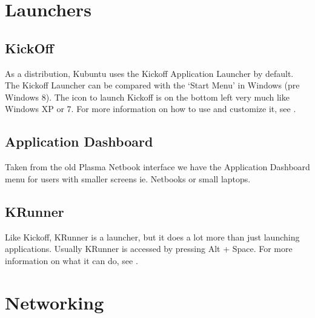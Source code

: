 \documentclass[letterpaper,10pt,english]{sphinxmanual}
\begin{document}
\section{Launchers}
\label{\detokenize{docs/basic:launchers}}

\subsection{KickOff}
\label{\detokenize{docs/basic:kickoff}}
As a  distribution, Kubuntu uses the Kickoff Application Launcher by default. The Kickoff Launcher can be compared with the `Start Menu' in Windows (pre Windows 8). The icon to launch Kickoff is on the bottom left very much like Windows XP or 7. For more information on how to use and customize it, see .


\subsection{Application Dashboard}
\label{\detokenize{docs/basic:application-dashboard}}

Taken from the old Plasma Netbook interface we have the Application Dashboard menu for users with smaller screens ie. Netbooks or small laptops.


\subsection{KRunner}
\label{\detokenize{docs/basic:krunner}}
Like Kickoff, KRunner is a launcher, but it does a lot more than just launching applications. Usually KRunner is accessed by pressing Alt + Space. For more information on what it can do, see .


\section{Networking}
\label{\detokenize{docs/basic:networking}}
\end{document}
